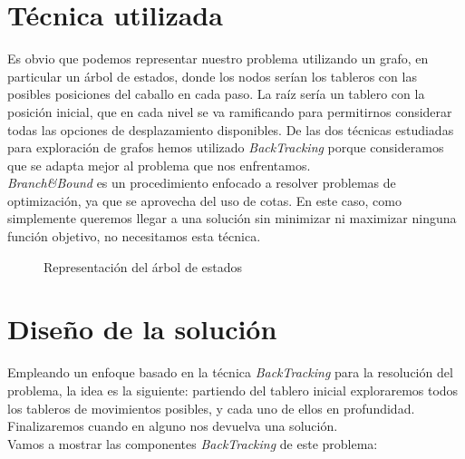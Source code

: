 \documentclass[11pt]{article}
\begin{document}
\section*{Técnica utilizada}

Es obvio que podemos representar nuestro problema utilizando un grafo, en particular un árbol de estados, donde los nodos serían los tableros con las posibles posiciones del caballo en cada paso. La raíz sería un tablero con la posición inicial, que en cada nivel se va ramificando para permitirnos considerar todas las opciones de desplazamiento disponibles. De las dos técnicas estudiadas para exploración de grafos hemos utilizado \textit{BackTracking} porque consideramos que se adapta mejor al problema que nos enfrentamos.\\

\textit{Branch\&Bound} es un procedimiento enfocado a resolver problemas de optimización, ya que se aprovecha del uso de cotas. En este caso, como simplemente queremos llegar a una solución sin minimizar ni maximizar ninguna función objetivo, no necesitamos esta técnica.


\begin{figure}[h]
\caption{Representación del árbol de estados} \label{fig:árbol}
\end{figure}


\section*{Diseño de la solución}

Empleando un enfoque basado en la técnica \textit{BackTracking} para la resolución del problema, la idea es la siguiente: partiendo del tablero inicial exploraremos todos los tableros de movimientos posibles, y cada uno de ellos en profundidad. Finalizaremos cuando en alguno nos devuelva una solución.\\

Vamos a mostrar las componentes \textit{BackTracking} de este problema:
\end{document}
